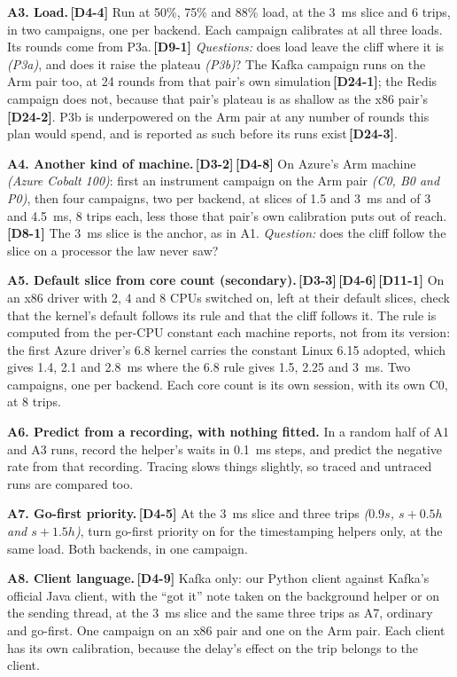 \documentclass[11pt]{article}
\newcommand{\gl}[1]{{\color{soft}\itshape\small (#1)}}
\newcommand{\chgold}[1]{\,{\color{oldcol}\bfseries\footnotesize[#1]}}
\begin{document}
\textbf{A3. Load.}\chgold{D4-4} Run at 50\%, 75\% and 88\% load, at the 3~ms slice and 6 trips, in two campaigns, one per backend. Each campaign calibrates at all three loads. Its rounds come from P3a.\chgold{D9-1} \emph{Questions:} does load leave the cliff where it is \gl{P3a}, and does it raise the plateau \gl{P3b}? The Kafka campaign runs on the Arm pair too, at 24 rounds from that pair's own simulation\chgold{D24-1}; the Redis campaign does not, because that pair's plateau is as shallow as the x86 pair's\chgold{D24-2}. P3b is underpowered on the Arm pair at any number of rounds this plan would spend, and is reported as such before its runs exist\chgold{D24-3}.

\textbf{A4. Another kind of machine.}\chgold{D3-2}\chgold{D4-8} On Azure's Arm machine \gl{Azure Cobalt 100}: first an instrument campaign on the Arm pair \gl{C0, B0 and P0}, then four campaigns, two per backend, at slices of 1.5 and 3~ms and of 3 and 4.5~ms, 8 trips each, less those that pair's own calibration puts out of reach.\chgold{D8-1} The 3~ms slice is the anchor, as in A1. \emph{Question:} does the cliff follow the slice on a processor the law never saw?

\textbf{A5. Default slice from core count (secondary).}\chgold{D3-3}\chgold{D4-6}\chgold{D11-1} On an x86 driver with 2, 4 and 8 CPUs switched on, left at their default slices, check that the kernel's default follows its rule and that the cliff follows it. The rule is computed from the per-CPU constant each machine reports, not from its version: the first Azure driver's 6.8 kernel carries the constant Linux 6.15 adopted, which gives 1.4, 2.1 and 2.8~ms where the 6.8 rule gives 1.5, 2.25 and 3~ms. Two campaigns, one per backend. Each core count is its own session, with its own C0, at 8 trips.

\textbf{A6. Predict from a recording, with nothing fitted.} In a random half of A1 and A3 runs, record the helper's waits in 0.1~ms steps, and predict the negative rate from that recording. Tracing slows things slightly, so traced and untraced runs are compared too.

\textbf{A7. Go-first priority.}\chgold{D4-5} At the 3~ms slice and three trips \gl{$0.9s$, $s + 0.5h$ and $s + 1.5h$}, turn go-first priority on for the timestamping helpers only, at the same load. Both backends, in one campaign.

\textbf{A8. Client language.}\chgold{D4-9} Kafka only: our Python client against Kafka's official Java client, with the ``got it'' note taken on the background helper or on the sending thread, at the 3~ms slice and the same three trips as A7, ordinary and go-first. One campaign on an x86 pair and one on the Arm pair. Each client has its own calibration, because the delay's effect on the trip belongs to the client.
\end{document}
